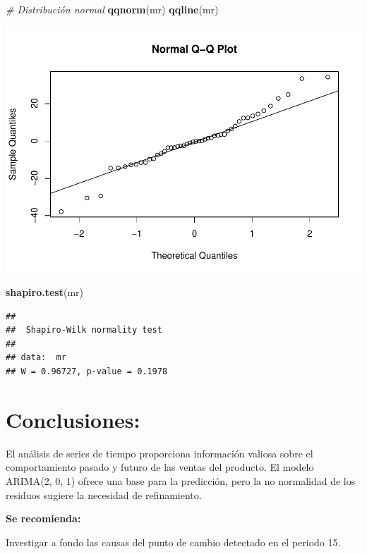 \documentclass[
]{book}
\newenvironment{Shaded}{\begin{snugshade}}{\end{snugshade}}
\newcommand{\CommentTok}[1]{\textcolor[rgb]{0.56,0.35,0.01}{\textit{#1}}}
\newcommand{\FunctionTok}[1]{\textcolor[rgb]{0.13,0.29,0.53}{\textbf{#1}}}
\newcommand{\NormalTok}[1]{#1}
\begin{document}
\begin{Shaded}
\begin{Highlighting}[]
\CommentTok{\# Distribución normal}
\FunctionTok{qqnorm}\NormalTok{(mr)}
\FunctionTok{qqline}\NormalTok{(mr)}
\end{Highlighting}
\end{Shaded}

\includegraphics{_main_files/figure-latex/unnamed-chunk-21-2.pdf}

\begin{Shaded}
\begin{Highlighting}[]
\FunctionTok{shapiro.test}\NormalTok{(mr)}
\end{Highlighting}
\end{Shaded}

\begin{verbatim}
## 
##  Shapiro-Wilk normality test
## 
## data:  mr
## W = 0.96727, p-value = 0.1978
\end{verbatim}

\section{Conclusiones:}\label{conclusiones}

El análisis de series de tiempo proporciona información valiosa sobre el comportamiento pasado y futuro de las ventas del producto. El modelo ARIMA(2, 0, 1) ofrece una base para la predicción, pero la no normalidad de los residuos sugiere la necesidad de refinamiento.

\textbf{Se recomienda:}

Investigar a fondo las causas del punto de cambio detectado en el periodo 15.
\end{document}
